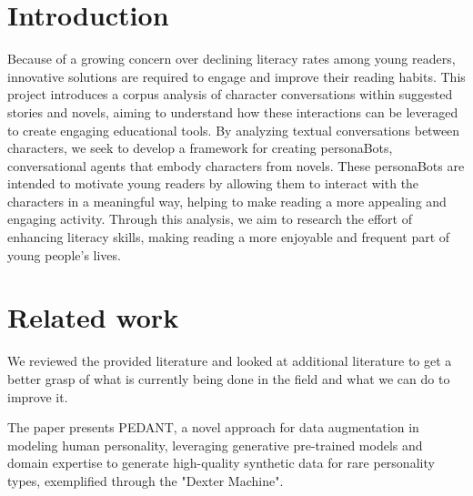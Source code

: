 \documentclass[fleqn,moreauthors,10pt]{ds_report}
\affiliation{\textit{Advisor: Slavko Žitnik}}
\begin{document}
\flushbottom 

\maketitle 

\thispagestyle{empty} 

\section*{Introduction}
	Because of a growing concern over declining literacy rates among young readers, innovative solutions are required to engage and improve their reading habits. This project introduces a corpus analysis of character conversations within suggested stories and novels, aiming to understand how these interactions can be leveraged to create engaging educational tools. By analyzing textual conversations between characters, we seek to develop a framework for creating personaBots, conversational agents that embody characters from novels. These personaBots are intended to motivate young readers by allowing them to interact with the characters in a meaningful way, helping to make reading a more appealing and engaging activity. Through this analysis, we aim to research the effort of enhancing literacy skills, making reading a more enjoyable and frequent part of young people's lives.



\section*{Related work}

We reviewed the provided literature \cite{alaimi2020pedagogical, bogaerds2022textbooks, engel2015competitive, goldberg2013alternative, murray2021literacy, neuman2023data, nielen2018digital, papaioannou2022designing, wu2023openicl, zwaan1998constructing} and looked at additional literature to get a better grasp of what is currently being done in the field and what we can do to improve it.

The \cite{neuman2023data} paper presents PEDANT, a novel approach for data augmentation in modeling human personality, leveraging generative pre-trained models and domain expertise to generate high-quality synthetic data for rare personality types, exemplified through the "Dexter Machine". 
\end{document}
